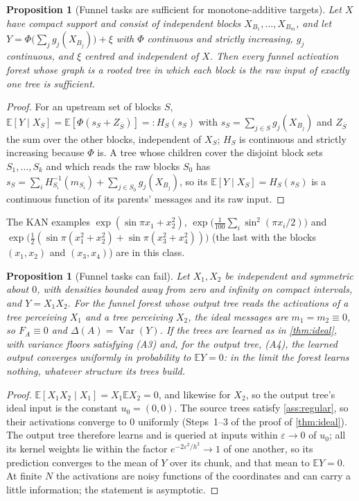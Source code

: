 \documentclass[11pt]{article}
\newtheorem{proposition}[theorem]{Proposition}
\theoremstyle{definition}
\theoremstyle{remark}
\newcommand{\E}{\mathbb{E}}
\newcommand{\Var}{\operatorname{Var}}
\begin{document}
\begin{proposition}[Funnel tasks are sufficient for monotone-additive targets]\label{prop:suffclass}
Let $X$ have compact support and consist of independent blocks $X_{B_1},\dots,X_{B_m}$, and let
$Y=\Phi\bigl(\sum_jg_j(X_{B_j})\bigr)+\xi$ with $\Phi$ continuous and strictly increasing,
$g_j$ continuous, and $\xi$ centred and independent of $X$.  Then every funnel
activation forest whose graph is a rooted tree in which each block is the raw input of
exactly one tree is sufficient.
\end{proposition}
\begin{proof}
For an upstream set of blocks $S$, $\E[Y\mid X_S]=\E[\Phi(s_S+Z_{\bar S})]=:H_S(s_S)$ with
$s_S=\sum_{j\in S}g_j(X_{B_j})$ and $Z_{\bar S}$ the sum over the other blocks, independent
of $X_S$; $H_S$ is continuous and strictly increasing because $\Phi$ is.  A tree whose
children cover the disjoint block sets $S_1,\dots,S_k$ and which reads the raw blocks $S_0$
has $s_S=\sum_iH_{S_i}^{-1}(m_{S_i})+\sum_{j\in S_0}g_j(X_{B_j})$, so its
$\E[Y\mid X_S]=H_S(s_S)$ is a continuous function of its parents' messages and its raw
input.
\end{proof}

The KAN examples $\exp(\sin\pi x_1+x_2^2)$, $\exp\bigl(\tfrac1{100}\sum_i\sin^2(\pi x_i/2)\bigr)$
and $\exp\bigl(\tfrac12(\sin\pi(x_1^2+x_2^2)+\sin\pi(x_3^2+x_4^2))\bigr)$ (the last with
the blocks $(x_1,x_2)$ and $(x_3,x_4)$) are in this class.

\begin{proposition}[Funnel tasks can fail]\label{prop:xy}
Let $X_1,X_2$ be independent and symmetric about $0$, with densities bounded away from
zero and infinity on compact intervals, and $Y=X_1X_2$.  For the funnel forest whose output tree reads
the activations of a tree perceiving $X_1$ and a tree perceiving $X_2$, the ideal
messages are $m_1=m_2\equiv0$, so $F_A\equiv0$ and $\Delta(A)=\Var(Y)$.  If the trees are
learned as in \cref{thm:ideal}, with variance floors satisfying (A3) and, for the output
tree, (A4),
the learned output converges uniformly in probability to $\E Y=0$: in the limit the
forest learns nothing, whatever structure its trees build.
\end{proposition}
\begin{proof}
$\E[X_1X_2\mid X_1]=X_1\E X_2=0$, and likewise for $X_2$, so the output tree's ideal input
is the constant $u_0=(0,0)$.  The source trees satisfy \cref{ass:regular}, so their
activations converge to $0$ uniformly (Steps~1--3 of the proof of \cref{thm:ideal}).  The
output tree therefore learns and is queried at inputs within $\varepsilon\to0$ of $u_0$;
all its kernel weights lie within the factor $e^{-2\varepsilon^2/h^2}\to1$ of one another,
so its prediction converges to the mean of $Y$ over its chunk, and that mean to $\E Y=0$.
At finite $N$ the activations are noisy functions of the coordinates and can carry a
little information; the statement is asymptotic.
\end{proof}
\end{document}
